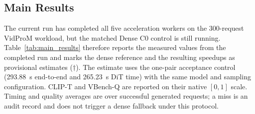 \subsection{Main Results}

The current run has completed all five acceleration workers on the 300-request
VidProM workload, but the matched Dense C0 control is still running.  Table~\ref{tab:main_results}
therefore reports the measured values from the completed run and marks the dense
reference and the resulting speedups as provisional estimates ($\dagger$).  The
estimate uses the one-pair acceptance control (293.88~s end-to-end and 265.23~s
DiT time) with the same model and sampling configuration.  CLIP-T and VBench-Q
are reported on their native $[0,1]$ scale.  Timing and quality averages are over
successful generated requests; a miss is an audit record and does not trigger a
dense fallback under this protocol.

\begin{table}[htbp]
\centering
\caption{Provisional main results on Wan2.2-TI2V-5B (121 frames, $1280\times704$,
50 UniPC steps).  $\dagger$ denotes an estimate anchored to the single-pair Dense
acceptance control; all other entries are measured in the 300-request run.  The
Carnator row uses the current unbounded-gate B5 diagnostic run (all four signature
thresholds set to $10^6$), not the final calibrated gate.}
\label{tab:main_results}
\end{table}

